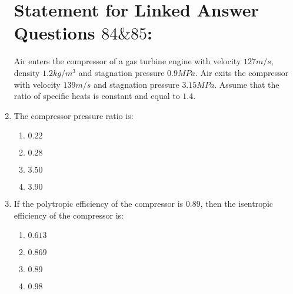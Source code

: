 \documentclass[journal]{IEEEtran}
\begin{document}
\begin{enumerate}
\section*{Statement for Linked Answer Questions $84 \& 85$:}
Air enters the compressor of a gas turbine engine with velocity $127 m/s$, density $1.2 kg/m^3$ and stagnation pressure $0.9 MPa$. Air exits the compressor with velocity $139 m/s$ and stagnation pressure $3.15 MPa$. Assume that the ratio of specific heats is constant and equal to $1.4$.\\

\item The compressor pressure ratio is:
\begin{enumerate}
    \item  $0.22$
    \item  $0.28$
    \item  $3.50$
    \item  $3.90$\\
\end{enumerate}

\item If the polytropic efficiency of the compressor is $0.89$, then the isentropic efficiency of the compressor is:
\begin{enumerate}
    \item  $0.613$
    \item  $0.869$
    \item  $0.89$
    \item  $0.98$\\
\end{enumerate}

\end{enumerate}
\end{document}
